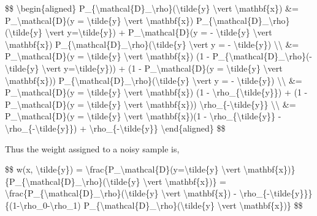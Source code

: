 \$\$ \textbackslash begin\{aligned\} P\_\{\textbackslash mathcal\{D\}\_\textbackslash rho\}(\textbackslash tilde\{y\} \textbackslash vert \textbackslash mathbf\{x\}) \&= P\_\textbackslash mathcal\{D\}(y = \textbackslash tilde\{y\} \textbackslash vert \textbackslash mathbf\{x\}) P\_\{\textbackslash mathcal\{D\}\_\textbackslash rho\}(\textbackslash tilde\{y\} \textbackslash vert y=\textbackslash tilde\{y\}) + P\_\textbackslash mathcal\{D\}(y = - \textbackslash tilde\{y\} \textbackslash vert \textbackslash mathbf\{x\}) P\_\{\textbackslash mathcal\{D\}\_\textbackslash rho\}(\textbackslash tilde\{y\} \textbackslash vert y = - \textbackslash tilde\{y\}) \textbackslash\textbackslash{} \&= P\_\textbackslash mathcal\{D\}(y = \textbackslash tilde\{y\} \textbackslash vert \textbackslash mathbf\{x\}) (1 - P\_\{\textbackslash mathcal\{D\}\_\textbackslash rho\}(- \textbackslash tilde\{y\} \textbackslash vert y=\textbackslash tilde\{y\})) + (1 - P\_\textbackslash mathcal\{D\}(y = \textbackslash tilde\{y\} \textbackslash vert \textbackslash mathbf\{x\})) P\_\{\textbackslash mathcal\{D\}\_\textbackslash rho\}(\textbackslash tilde\{y\} \textbackslash vert y = - \textbackslash tilde\{y\}) \textbackslash\textbackslash{} \&= P\_\textbackslash mathcal\{D\}(y = \textbackslash tilde\{y\} \textbackslash vert \textbackslash mathbf\{x\}) (1 - \textbackslash rho\_\{\textbackslash tilde\{y\}\}) + (1 - P\_\textbackslash mathcal\{D\}(y = \textbackslash tilde\{y\} \textbackslash vert \textbackslash mathbf\{x\})) \textbackslash rho\_\{-\textbackslash tilde\{y\}\} \textbackslash\textbackslash{} \&= P\_\textbackslash mathcal\{D\}(y = \textbackslash tilde\{y\} \textbackslash vert \textbackslash mathbf\{x\})(1 - \textbackslash rho\_\{\textbackslash tilde\{y\}\} - \textbackslash rho\_\{-\textbackslash tilde\{y\}\}) + \textbackslash rho\_\{-\textbackslash tilde\{y\}\} \textbackslash end\{aligned\} \$\$

Thus the weight assigned to a noisy sample is,

\$\$ w(x, \textbackslash tilde\{y\}) = \textbackslash frac\{P\_\textbackslash mathcal\{D\}(y=\textbackslash tilde\{y\} \textbackslash vert \textbackslash mathbf\{x\})\}\{P\_\{\textbackslash mathcal\{D\}\_\textbackslash rho\}(\textbackslash tilde\{y\} \textbackslash vert \textbackslash mathbf\{x\})\} = \textbackslash frac\{P\_\{\textbackslash mathcal\{D\}\_\textbackslash rho\}(\textbackslash tilde\{y\} \textbackslash vert \textbackslash mathbf\{x\}) - \textbackslash rho\_\{-\textbackslash tilde\{y\}\}\}\{(1-\textbackslash rho\_0-\textbackslash rho\_1) P\_\{\textbackslash mathcal\{D\}\_\textbackslash rho\}(\textbackslash tilde\{y\} \textbackslash vert \textbackslash mathbf\{x\})\} \$\$

